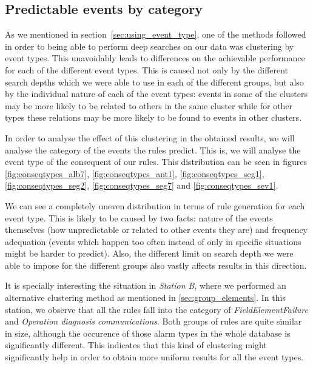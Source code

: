\subsection{Predictable events by category}
As we mentioned in section~\ref{sec:using_event_type}, one of the methods followed in order to being able to perform deep searches on our data was clustering by event types. This unavoidably leads to differences on the achievable performance for each of the different event types. This is caused not only by the different search depths which we were able to use in each of the different groups, but also by the individual nature of each of the event types: events in some of the clusters may be more likely to be related to others in the same cluster while for other types these relations may be more likely to be found to events in other clusters. 

In order to analyse the effect of this clustering in the obtained results, we will analyse the category of the events the rules predict. This is, we will analyse the event type of the consequent of our rules. This distribution can be seen in figures \ref{fig:conseqtypes_alb7}, \ref{fig:conseqtypes_ant1}, \ref{fig:conseqtypes_seg1}, \ref{fig:conseqtypes_seg2}, \ref{fig:conseqtypes_seg7} and \ref{fig:conseqtypes_sev1}.

We can see a completely uneven distribution in terms of rule generation for each event type. This is likely to be caused by two facts: nature of the events themselves (how unpredictable or related to other events they are) and frequency adequation (events which happen too often instead of only in specific situations might be harder to predict). Also, the different limit on search depth we were able to impose for the different groups also vastly affects results in this direction.

It is specially interesting the situation in \emph{Station B}, where we performed an alternative clustering method as mentioned in \ref{sec:group_elements}. In this station, we observe that all the rules fall into the category of \emph{FieldElementFailure} and \emph{Operation diagnosis communications}. Both groups of rules are quite similar in size, although the occurence of those alarm types in the whole database is significantly different. This indicates that this kind of clustering might significantly help in order to obtain more uniform results for all the event types.

